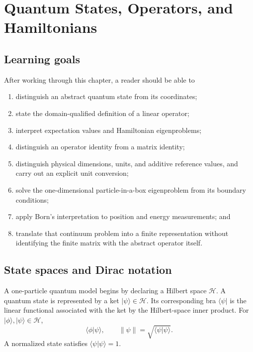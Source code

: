 \chapter{Quantum States, Operators, and Hamiltonians}

\label{ch:training-quantum-operators}


\section{Learning goals}

After working through this chapter, a reader should be able to

\begin{enumerate}
  \item distinguish an abstract quantum state from its coordinates;
  \item state the domain-qualified definition of a linear operator;
  \item interpret expectation values and Hamiltonian eigenproblems;
  \item distinguish an operator identity from a matrix identity;
  \item distinguish physical dimensions, units, and additive reference values,
        and carry out an explicit unit conversion;
  \item solve the one-dimensional particle-in-a-box eigenproblem from its
        boundary conditions;
  \item apply Born's interpretation to position and energy measurements; and
  \item translate that continuum problem into a finite representation without
        identifying the finite matrix with the abstract operator itself.
\end{enumerate}

\section{State spaces and Dirac notation}

A one-particle quantum model begins by declaring a Hilbert space \(\mathcal H\).
A quantum state is represented by a ket
\(\lvert\psi\rangle\in\mathcal H\). Its corresponding bra
\(\langle\psi\rvert\) is the linear functional associated with the ket by the
Hilbert-space inner product. For
\(\lvert\phi\rangle,\lvert\psi\rangle\in\mathcal H\),
\begin{equation}
  \langle\phi\vert\psi\rangle,
  \qquad
  \lVert\psi\rVert
  =\sqrt{\langle\psi\vert\psi\rangle}.
\end{equation}
A normalized state satisfies
\(\langle\psi\vert\psi\rangle=1\).

